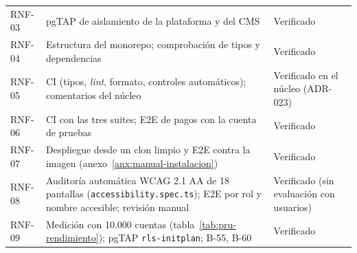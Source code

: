 \begin{longtable}{@{}l>{\raggedright\arraybackslash}p{8.4cm}>{\raggedright\arraybackslash}p{3.6cm}@{}}
  RNF-03 & pgTAP de aislamiento de la plataforma y del CMS & Verificado \\
  RNF-04 & Estructura del monorepo; comprobación de tipos y dependencias & Verificado \\
  RNF-05 & CI (tipos, \textit{lint}, formato, controles automáticos); comentarios del núcleo & Verificado en el núcleo (ADR-023) \\
  RNF-06 & CI con las tres suites; E2E de pagos con la cuenta de pruebas & Verificado \\
  RNF-07 & Despliegue desde un clon limpio y E2E contra la imagen (anexo~\ref{anx:manual-instalacion}) & Verificado \\
  RNF-08 & Auditoría automática WCAG 2.1 AA de 18 pantallas (\texttt{accessibility.spec.ts}); E2E por rol y nombre accesible; revisión manual & Verificado (sin evaluación con usuarios) \\
  RNF-09 & Medición con 10.000 cuentas (tabla~\ref{tab:pru-rendimiento}); pgTAP \texttt{rls-initplan}; B-55, B-60 & Verificado \\
\end{longtable}
